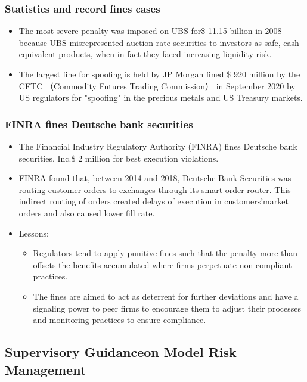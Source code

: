 \subsubsection{Statistics and record fines cases}
\begin{itemize}
\item The most severe penalty was imposed on UBS for\$ 11.15 billion in 2008 because UBS misrepresented auction rate securities to investors as safe, cash-equivalent products, when in fact they faced increasing liquidity risk.
\item The largest fine for spoofing is held by JP Morgan fined \$ 920 million by the CFTC （Commodity Futures Trading Commission） in September 2020 by US regulators for "spoofing" in the precious metals and US Treasury markets.

\end{itemize}




\subsubsection{FINRA fines Deutsche bank securities}
\begin{itemize}
\item The Financial Industry Regulatory Authority (FINRA) fines Deutsche bank securities, Inc.\$ 2 million for best execution violations.
\item FINRA found that, between 2014 and 2018, Deutsche Bank Securities was routing customer orders to exchanges through its smart order router. This indirect routing of orders created delays of execution in customers'market orders and also caused lower fill rate.
\item Lessons:
    \begin{itemize}
    \item Regulators tend to apply punitive fines such that the penalty more than offsets the benefits accumulated where firms perpetuate non-compliant practices.
    \item The fines are aimed to act as deterrent for further deviations and have a signaling power to peer firms to encourage them to adjust their processes and monitoring practices to ensure compliance.
    \end{itemize}
\end{itemize}




\subsection{ Supervisory Guidanceon Model Risk Management}



